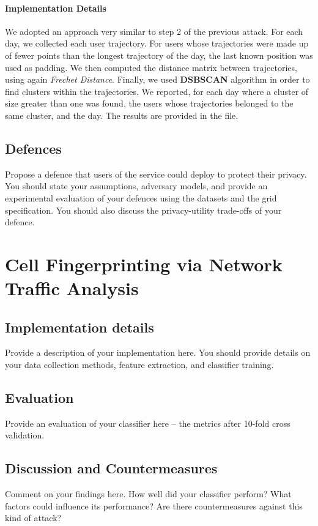 \documentclass[10pt,conference,compsocconf]{IEEEtran}
\begin{document}
\paragraph{Implementation Details}
We adopted an approach very similar to step 2 of the previous attack. For each day, we collected each user trajectory. For users whose trajectories were made up of fewer points than the longest trajectory of the day, the last known position was used as padding. We then computed the distance matrix between trajectories, using again \textit{Frechet Distance}. Finally, we used \textbf{DSBSCAN} algorithm in order to find clusters within the trajectories. We reported, for each day where a cluster of size greater than one was found, the users whose trajectories belonged to the same cluster, and the day. The results are provided in the  file.


\subsection{Defences}
Propose a defence that users of the service could deploy to protect their privacy.  You
should state your assumptions, adversary models, and provide an experimental evaluation of your
defences using the datasets and the grid specification. You should also discuss the
privacy-utility trade-offs of your defence.

\section{Cell Fingerprinting via Network Traffic Analysis}

\subsection{Implementation details}
Provide a description of your implementation here. You should provide details on your data collection methods, feature extraction, and classifier training.

\subsection{Evaluation}
Provide an evaluation of your classifier here -- the metrics after 10-fold cross validation.

\subsection{Discussion and Countermeasures}
Comment on your findings here. How well did your classifier perform? What factors could influence its performance? Are there countermeasures against this kind of attack?



\end{document}

